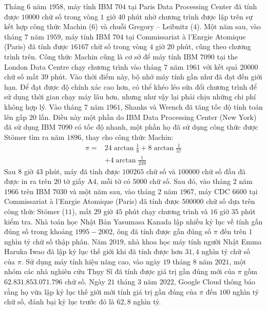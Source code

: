 \begin{multicols}{2}
	\vskip 0.1cm
	Tháng $6$ năm $1958$, máy tính IBM $704$ tại Paris Data Processing Center đã tính được $10000$ chữ số trong vòng $1$ giờ $40$ phút nhờ chương trình được lập trên sự kết hợp công thức Machin ($6$) và chuỗi Gregory -- Leibnitz ($4$).
	\vskip 0.1cm
	Một năm sau, vào tháng $7$ năm $1959$, máy tính IBM $704$ tại Commissariat à l'Enrgie Atomique (Paris) đã tính được $16167$ chữ số trong vòng $4$ giờ $20$ phút, cũng theo chương trình trên.
	\vskip 0.1cm
	Công thức Machin cũng là cơ sở để máy tính IBM $7090$ tại the London Data Centre chạy chương trình vào tháng $7$ năm $1961$ với kết quả $20000$ chữ số mất $39$ phút.
	\vskip 0.1cm
	Vào thời điểm này, bộ nhớ máy tính gần như đã đạt đến giới hạn. Để đạt được độ chính xác cao hơn, có thể khéo léo sửa đổi chương trình để sử dụng thời gian chạy máy lâu hơn, nhưng như vậy lại phải chịu những chi phí không hợp lý.
	\vskip 0.1cm
	Vào tháng $7$ năm $1961$, Shanks và Wrench đã tăng tốc độ tính toán lên gấp $20$ lần. Điều này một phần do IBM Data Processing Center (New York) đã sử dụng IBM $7090$ có tốc độ nhanh, một phần họ đã sử dụng công thức được Stömer tìm ra năm $1896$, thay cho công thức Machin:
	\begin{align*}
		\pi  =& 24\arctan \frac{1}{8} + 8\arctan \frac{1}{{57}} \\
		&+ 4\arctan \frac{1}{{239}} \tag{$11$}
	\end{align*}
	Sau $8$ giờ $43$ phút, máy đã tính được $100265$ chữ số và $100000$ chữ số đầu đã được in ra trên $20$ tờ giấy A$4$, mỗi tờ có $5000$ chữ số.
	\vskip 0.1cm
	Sau đó, vào tháng $2$ năm $1966$ trên IBM $7030$ và một năm sau, vào tháng $2$ năm $1967$, máy CDC $6600$ tại Commissariat à l'Enrgie Atomique (Paris) đã tính được $500000$ chữ số dựa trên công thức Stömer ($11$), mất $29$ giờ $45$ phút chạy chương trình và $16$ giờ $35$ phút kiểm tra. 
	\vskip 0.1cm
	Nhà toán học Nhật Bản Yasumasa Kanada lập nhiều kỷ lục về tính gần đúng số   trong khoảng $1995-2002$, ông đã tính được gần đúng số  $\pi$ đến trên $1$ nghìn tỷ chữ số thập phân.
	\vskip 0.1cm
	Năm $2019$, nhà khoa học máy tính người Nhật Emma Haruka Iwao đã lập kỷ lục thế giới khi đã tính được hơn $31{,}4$ nghìn tỷ chữ số của $\pi$.
	\vskip 0.1cm 
	Sử dụng máy tính hiệu năng cao, vào ngày $19$ tháng $8$ năm $2021$, một nhóm các nhà nghiên cứu Thụy Sĩ đã tính được giá trị gần đúng mới của $\pi$  gồm $62.831.853.071.796$ chữ số.
	\vskip 0.1cm
	Ngày $21$ tháng $3$ năm $2022$, Google Cloud thông báo rằng họ vừa lập kỷ lục thế giới mới tính giá trị gần đúng của $\pi$  đến $100$ nghìn tỷ chữ số, đánh bại kỷ lục trước đó là $62{,}8$ nghìn tỷ.

\end{multicols}
